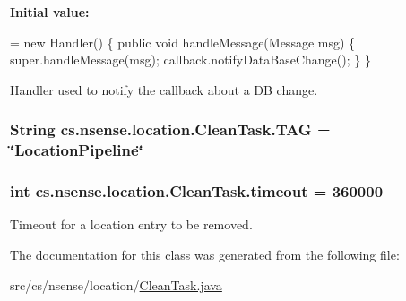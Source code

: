 {\bfseries Initial value\-:}
\begin{DoxyCode}
= \textcolor{keyword}{new} Handler() \{
        \textcolor{keyword}{public} \textcolor{keywordtype}{void} handleMessage(Message msg) \{
            super.handleMessage(msg);
            callback.notifyDataBaseChange();
        \}
    \}
\end{DoxyCode}
Handler used to notify the callback about a D\-B change. \hypertarget{classcs_1_1nsense_1_1location_1_1_clean_task_a9927b79e49a264400c35bd71613c75e3}{
\subsubsection[{T\-A\-G}]{\setlength{\rightskip}{0pt plus 5cm}String cs.\-nsense.\-location.\-Clean\-Task.\-T\-A\-G = \char`\"{}Location\-Pipeline\char`\"{}\hspace{0.3cm}{\ttfamily [private]}}}\label{classcs_1_1nsense_1_1location_1_1_clean_task_a9927b79e49a264400c35bd71613c75e3}
\hypertarget{classcs_1_1nsense_1_1location_1_1_clean_task_a09c6278040fc566807e1b0619d5bd649}{
\subsubsection[{timeout}]{\setlength{\rightskip}{0pt plus 5cm}int cs.\-nsense.\-location.\-Clean\-Task.\-timeout = 360000\hspace{0.3cm}{\ttfamily [private]}}}\label{classcs_1_1nsense_1_1location_1_1_clean_task_a09c6278040fc566807e1b0619d5bd649}
Timeout for a location entry to be removed. 

The documentation for this class was generated from the following file\-:\begin{DoxyCompactItemize}
\item 
src/cs/nsense/location/\hyperlink{_clean_task_8java}{Clean\-Task.\-java}\end{DoxyCompactItemize}
